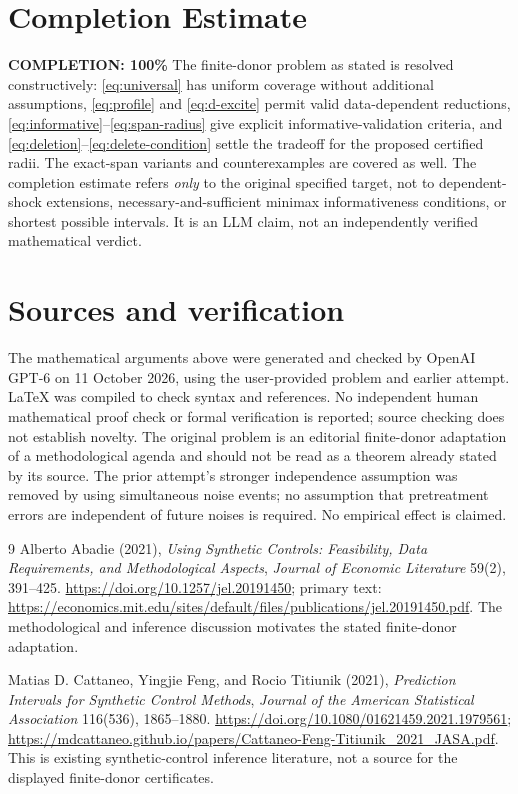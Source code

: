 \documentclass[11pt,a4paper]{article}
\begin{document}
\section{Completion Estimate}
\noindent\textbf{COMPLETION: 100\%}
The finite-donor problem as stated is resolved constructively: \eqref{eq:universal} has uniform coverage without additional assumptions, \eqref{eq:profile} and \eqref{eq:d-excite} permit valid data-dependent reductions, \eqref{eq:informative}--\eqref{eq:span-radius} give explicit informative-validation criteria, and \eqref{eq:deletion}--\eqref{eq:delete-condition} settle the tradeoff for the proposed certified radii. The exact-span variants and counterexamples are covered as well. The completion estimate refers \emph{only} to the original specified target, not to dependent-shock extensions, necessary-and-sufficient minimax informativeness conditions, or shortest possible intervals. It is an LLM claim, not an independently verified mathematical verdict.

\section*{Sources and verification}
The mathematical arguments above were generated and checked by OpenAI GPT-6 on 11 October 2026, using the user-provided problem and earlier attempt. LaTeX was compiled to check syntax and references. No independent human mathematical proof check or formal verification is reported; source checking does not establish novelty. The original problem is an editorial finite-donor adaptation of a methodological agenda and should not be read as a theorem already stated by its source. The prior attempt's stronger independence assumption was removed by using simultaneous noise events; no assumption that pretreatment errors are independent of future noises is required. No empirical effect is claimed.

\begin{thebibliography}{9}
Alberto Abadie (2021), \emph{Using Synthetic Controls: Feasibility, Data Requirements, and Methodological Aspects},
\emph{Journal of Economic Literature} 59(2), 391--425.
\url{https://doi.org/10.1257/jel.20191450}; primary text:
\url{https://economics.mit.edu/sites/default/files/publications/jel.20191450.pdf}.
The methodological and inference discussion motivates the stated finite-donor adaptation.

Matias D. Cattaneo, Yingjie Feng, and Rocio Titiunik (2021),
\emph{Prediction Intervals for Synthetic Control Methods},
\emph{Journal of the American Statistical Association} 116(536), 1865--1880.
\url{https://doi.org/10.1080/01621459.2021.1979561};
\url{https://mdcattaneo.github.io/papers/Cattaneo-Feng-Titiunik_2021_JASA.pdf}.
This is existing synthetic-control inference literature, not a source for the displayed finite-donor certificates.
\end{thebibliography}
\end{document}
